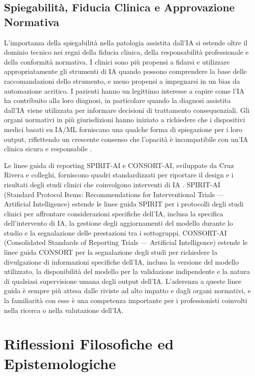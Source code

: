 \subsection{Spiegabilità, Fiducia Clinica e Approvazione Normativa}

L'importanza della spiegabilità nella patologia assistita dall'IA si estende oltre il dominio tecnico nei regni della fiducia clinica, della responsabilità professionale e della conformità normativa. I clinici sono più propensi a fidarsi e utilizzare appropriatamente gli strumenti di IA quando possono comprendere la base delle raccomandazioni dello strumento, e meno propensi a impegnarsi in un bias da automazione acritico. I pazienti hanno un legittimo interesse a capire come l'IA ha contribuito alla loro diagnosi, in particolare quando la diagnosi assistita dall'IA viene utilizzata per informare decisioni di trattamento consequenziali. Gli organi normativi in più giurisdizioni hanno iniziato a richiedere che i dispositivi medici basati su IA/ML forniscano una qualche forma di spiegazione per i loro output, riflettendo un crescente consenso che l'opacità è incompatibile con un'IA clinica sicura e responsabile \cite{zhang2023}.

Le linee guida di reporting SPIRIT-AI e CONSORT-AI, sviluppate da Cruz Rivera e colleghi, forniscono quadri standardizzati per riportare il design e i risultati degli studi clinici che coinvolgono interventi di IA \cite{cruzirivera2020}. SPIRIT-AI (Standard Protocol Items: Recommendations for Interventional Trials — Artificial Intelligence) estende le linee guida SPIRIT per i protocolli degli studi clinici per affrontare considerazioni specifiche dell'IA, inclusa la specifica dell'intervento di IA, la gestione degli aggiornamenti del modello durante lo studio e la segnalazione delle prestazioni tra i sottogruppi. CONSORT-AI (Consolidated Standards of Reporting Trials — Artificial Intelligence) estende le linee guida CONSORT per la segnalazione degli studi per richiedere la divulgazione di informazioni specifiche dell'IA, inclusa la versione del modello utilizzato, la disponibilità del modello per la validazione indipendente e la natura di qualsiasi supervisione umana degli output dell'IA. L'aderenza a queste linee guida è sempre più attesa dalle riviste ad alto impatto e dagli organi normativi, e la familiarità con esse è una competenza importante per i professionisti coinvolti nella ricerca o nella valutazione dell'IA.

\section{Riflessioni Filosofiche ed Epistemologiche}
\label{sec:ch5_philosophy}

